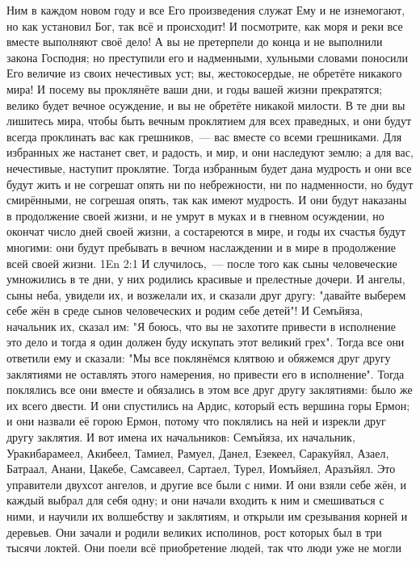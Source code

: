 Ним в каждом новом году и все Его произведения служат Ему и не изнемогают,
но как установил Бог, так всё и происходит!
И посмотрите, как моря и реки все вместе выполняют своё дело!
А вы не претерпели до конца и не выполнили закона Господня; но
преступили его и надменными, хульными словами поносили Его величие из своих
нечестивых уст; вы, жестокосердые, не обретёте никакого мира!
И посему вы проклянёте ваши дни, и годы вашей жизни прекратятся;
велико будет вечное осуждение, и вы не обретёте никакой милости.
В те дни вы лишитесь мира, чтобы быть вечным проклятием для всех
праведных, и они будут всегда проклинать вас как грешников,~--- вас вместе со
всеми грешниками.
Для избранных же настанет свет, и радость, и мир, и они наследуют
землю; а для вас, нечестивые, наступит проклятие.
Тогда избранным будет дана мудрость и они все будут жить и не
согрешат опять ни по небрежности, ни по надменности, но будут смирёнными, не
согрешая опять, так как имеют мудрость.
И они будут наказаны в продолжение своей жизни, и не умрут в муках
и в гневном осуждении, но окончат число дней своей жизни, а состареются в
мире, и годы их счастья будут многими: они будут пребывать в вечном
наслаждении и в мире в продолжение всей своей жизни.
\vs 1En 2:1
И случилось,~--- после того как сыны человеческие умножились в те
дни, у них родились красивые и прелестные дочери.
И ангелы, сыны неба, увидели их, и возжелали их, и сказали друг
другу: "давайте выберем себе жён в среде сынов человеческих и родим себе
детей"!
И Семъйяза,  начальник их,  сказал им: "Я боюсь, что вы не захотите
привести в исполнение это дело и тогда я  один  должен  буду  искупать
этот великий грех".
Тогда все они ответили ему и сказали: "Мы все поклянёмся клятвою и
обяжемся друг другу заклятиями не оставлять этого намерения, но привести его в
исполнение".
Тогда  поклялись  все  они вместе и обязались в этом все друг другу
заклятиями: было же их всего двести.
И они спустились на Ардис,  который есть вершина горы Ермон;  и они
назвали  её  горою  Ермон,  потому что поклялись на ней и изрекли друг другу
заклятия.
И вот имена их начальников:  Семъйяза, их начальник, Уракибарамеел,
Акибеел,  Тамиел,  Рамуел,  Данел, Езекеел, Саракуйял, Азаел, Батраал, Анани,
Цакебе, Самсавеел, Сартаел, Турел, Иомъйяел, Аразъйял. Это управители двухсот
ангелов, и другие все были с ними.
И они взяли себе жён, и каждый выбрал для себя одну; и они начали
входить к ним и смешиваться с ними, и научили их волшебству и заклятиям, и
открыли им срезывания корней и деревьев.
Они зачали и родили великих исполинов, рост которых был в три тысячи
локтей.
Они поели всё приобретение людей, так что люди уже не могли
